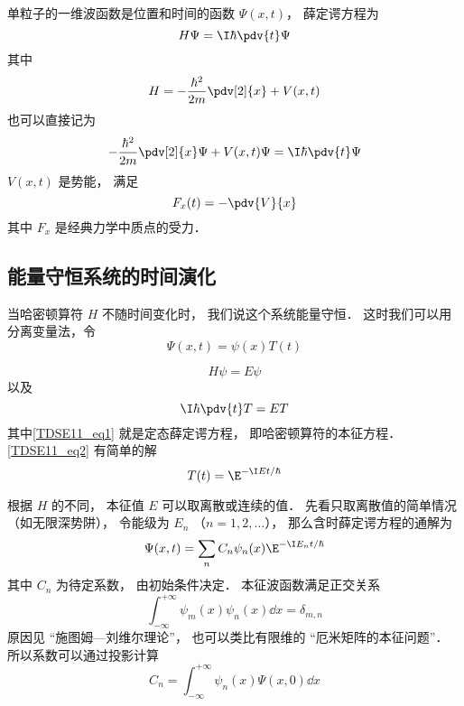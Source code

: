 
\begin{issues}
\issueDraft
\end{issues}


单粒子的一维波函数是位置和时间的函数 $\Psi(x, t)$， 薛定谔方程为
\begin{equation}
H\Psi = \I\hbar \pdv{t}\Psi
\end{equation}
其中
\begin{equation}
H = -\frac{\hbar^2}{2m}\pdv[2]{x} + V(x, t)
\end{equation}
也可以直接记为
\begin{equation}\label{TDSE11_eq3}
-\frac{\hbar^2}{2m}\pdv[2]{x}\Psi + V(x, t)\Psi = \I\hbar \pdv{t}\Psi
\end{equation}
$V(x,t)$ 是势能， 满足
\begin{equation}
F_x(t) = -\pdv{V}{x}
\end{equation}
其中 $F_x$ 是经典力学中质点的受力．

\subsection{能量守恒系统的时间演化}
当哈密顿算符 $H$ 不随时间变化时， 我们说这个系统能量守恒． 这时我们可以用分离变量法，令
\begin{equation}
\Psi(x, t) = \psi(x) T(t)
\end{equation}
 
\begin{equation}\label{TDSE11_eq1}
H\psi = E\psi
\end{equation}
以及
\begin{equation}\label{TDSE11_eq2}
\I \hbar\pdv{t}T = ET
\end{equation}
其中\autoref{TDSE11_eq1} 就是定态薛定谔方程， 即哈密顿算符的本征方程． \autoref{TDSE11_eq2} 有简单的解
\begin{equation}
T(t) = \E^{-\I E t/\hbar}
\end{equation}

根据 $H$ 的不同， 本征值 $E$ 可以取离散或连续的值． 先看只取离散值的简单情况（如无限深势阱）， 令能级为 $E_n$ （$n = 1, 2, \dots$）， 那么含时薛定谔方程的通解为
\begin{equation}\label{TDSE11_eq5}
\Psi(x, t) = \sum_n C_n \psi_n(x) \E^{-\I E_n t/\hbar}
\end{equation}
其中 $C_n$ 为待定系数， 由初始条件决定． 本征波函数满足正交关系
\begin{equation}
\int_{-\infty}^{+\infty}\psi_m(x)\psi_n(x)\dd{x} = \delta_{m,n}
\end{equation}
原因见 “施图姆—刘维尔理论”， 也可以类比有限维的 “厄米矩阵的本征问题”． 所以系数可以通过投影计算
\begin{equation}
C_n = \int_{-\infty}^{+\infty} \psi_n(x)\Psi(x, 0) \dd{x}
\end{equation}

